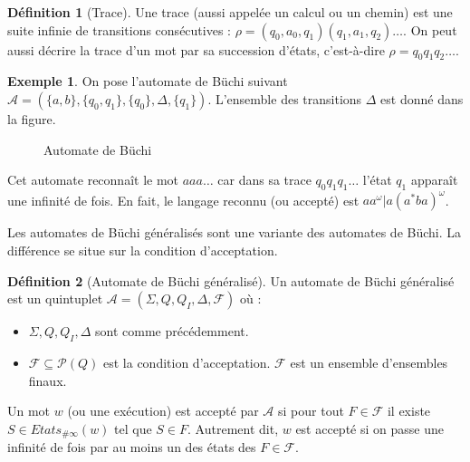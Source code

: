 \documentclass[12pt,a4paper]{article}
\theoremstyle{plain}
\theoremstyle{definition}
\newtheorem{defi}{Définition}
\newtheorem{ex}{Exemple}
\begin{document}
\begin{defi}[Trace]
  Une trace (aussi appelée un calcul ou un chemin) est une suite infinie de transitions consécutives : $\rho = (q_0,a_0,q_1)(q_1,a_1,q_2)\dots$.
  On peut aussi décrire la trace d'un mot par sa succession d'états, c'est-à-dire $\rho = q_0q_1q_2\dots$.
\end{defi}

\begin{ex}
  On pose l'automate de Büchi suivant $\mathcal{A}=(\{a,b\}, \{q_0, q_1\}, \{q_0\}, \Delta, \{q_1\})$.
  L'ensemble des transitions $\Delta$ est donné dans la figure.
  \begin{figure}[h]
    \centering
    \caption{Automate de Büchi}
  \end{figure}
  
  Cet automate reconnaît le mot $aaa\dots$ car dans sa trace $q_0q_1q_1\dots$ l'état $q_1$ apparaît une infinité de fois.
  En fait, le langage reconnu (ou accepté) est $aa^\omega | a(a^*ba)^\omega$.
\end{ex}

Les automates de Büchi généralisés sont une variante des automates de Büchi.
La différence se situe sur la condition d'acceptation.
\begin{defi}[Automate de Büchi généralisé]
Un automate de Büchi généralisé est un quintuplet $\mathcal{A}=(\Sigma, Q, Q_I, \Delta, \mathcal{F})$ où :
  \begin{itemize}
  \item $\Sigma, Q, Q_I, \Delta$ sont comme précédemment.
  \item $\mathcal{F} \subseteq \mathcal{P}(Q)$ est la condition d'acceptation.
    $\mathcal{F}$ est un ensemble d'ensembles finaux.
  \end{itemize}

  Un mot $w$ (ou une exécution) est accepté par $\mathcal{A}$ si pour tout $F \in \mathcal{F}$ il existe $S \in Etats_{\#\infty}(w)$ tel que $S \in F$.
  Autrement dit, $w$ est accepté si on passe une infinité de fois par au moins un des états des $F \in \mathcal{F}$.
\end{defi}
\end{document}

